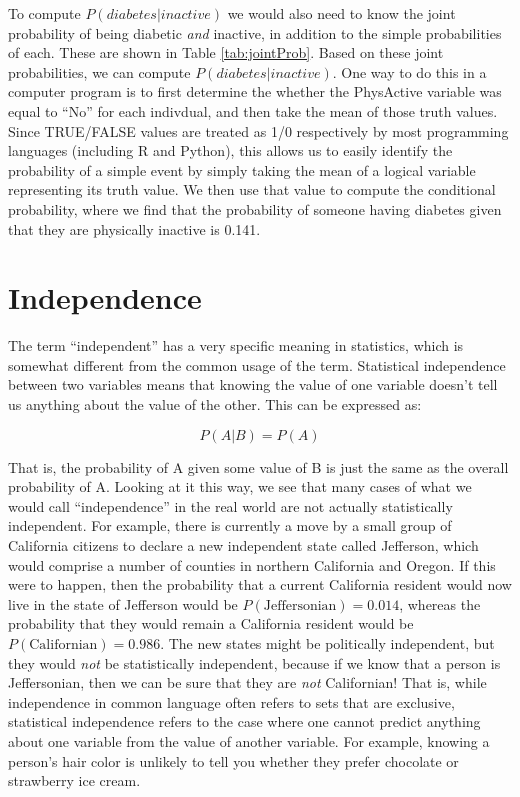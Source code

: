 \documentclass[
  12pt,
]{book}
\begin{document}
To compute \(P(diabetes|inactive)\) we would also need to know the joint probability of being diabetic \emph{and} inactive, in addition to the simple probabilities of each. These are shown in Table \ref{tab:jointProb}.
Based on these joint probabilities, we can compute \(P(diabetes|inactive)\). One way to do this in a computer program is to first determine the whether the PhysActive variable was equal to ``No'' for each indivdual, and then take the mean of those truth values. Since TRUE/FALSE values are treated as 1/0 respectively by most programming languages (including R and Python), this allows us to easily identify the probability of a simple event by simply taking the mean of a logical variable representing its truth value. We then use that value to compute the conditional probability, where we find that the probability of someone having diabetes given that they are physically inactive is 0.141.

\hypertarget{independence}{%
\section{Independence}\label{independence}}

The term ``independent'' has a very specific meaning in statistics, which is somewhat different from the common usage of the term. Statistical independence between two variables means that knowing the value of one variable doesn't tell us anything about the value of the other. This can be expressed as:

\[
P(A|B) = P(A)
\]

That is, the probability of A given some value of B is just the same as the overall probability of A. Looking at it this way, we see that many cases of what we would call ``independence'' in the real world are not actually statistically independent. For example, there is currently a move by a small group of California citizens to declare a new independent state called Jefferson, which would comprise a number of counties in northern California and Oregon. If this were to happen, then the probability that a current California resident would now live in the state of Jefferson would be \(P(\text{Jeffersonian})=0.014\), whereas the probability that they would remain a California resident would be \(P(\text{Californian})=0.986\). The new states might be politically independent, but they would \emph{not} be statistically independent, because if we know that a person is Jeffersonian, then we can be sure that they are \emph{not} Californian! That is, while independence in common language often refers to sets that are exclusive, statistical independence refers to the case where one cannot predict anything about one variable from the value of another variable. For example, knowing a person's hair color is unlikely to tell you whether they prefer chocolate or strawberry ice cream.
\end{document}
